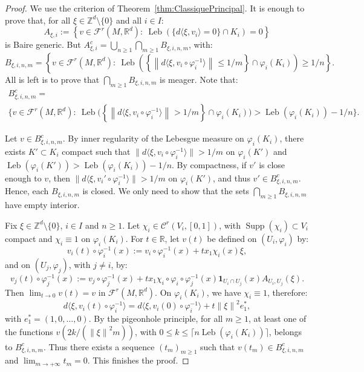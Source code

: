 \documentclass[10pt]{amsart}
\theoremstyle{definition}\newtheorem{defi}[theo]{Definition}\newtheorem{rema}[theo]{Remark}\newtheorem{exam}[theo]{Example}\newtheorem{exem}[theo]{Example}\newtheorem{nota}[theo]{Notation}
\DeclareMathOperator{\Leb}{Leb}
\DeclareMathOperator{\Supp}{Supp}
\newcommand{\Z}{\mathbb{Z}}
\newcommand{\R}{\mathbb{R}}
\newcommand{\Ccal}{\mathcal{C}}
\newcommand{\Fcal}{\mathcal{F}}
\newcommand{\norm}[2]{\left\| #1 \right\|_{#2}}
\begin{document}
\begin{proof}
We use the criterion of Theorem~\ref{thm:ClassiquePrincipal}. It is enough to prove that, for all $\xi \in \Z^d \setminus \{0\}$ and all $i \in I$:
\[
A_{\xi, i} := \left\{v \in \Fcal^r (M, \R^d): \ \Leb (\{d \langle \xi, v_i \rangle =0\} \cap K_i) = 0\right\}
\]
is Baire generic. But $A_{\xi, i}^c = \bigcup_{n \geq 1} \bigcap_{m \geq 1} B_{\xi, i, n, m}$, with:
\[
B_{\xi, i, n, m} = \left\{v \in \Fcal^r (M, \R^d): \ \Leb \left(\left\{\norm{d\langle \xi, v_i \circ \varphi_i^{-1} \rangle}{} \leq 1/m\right\} \cap \varphi_i(K_i)\right) \geq 1/n\right\}.
\]
All is left is to prove that $\bigcap_{m \geq 1} B_{\xi, i, n, m}$ is meager. Note that:
\begin{multline*}
B_{\xi, i, n, m}^c  =\\
\Big\{v \in \Fcal^r (M, \R^d):\!\ \Leb \Big(\left\{ \norm{d\langle \xi, v_i \circ \varphi_i^{-1} \rangle}{} > 1/m \right\} \cap \varphi_i(K_i) \Big) 
> \Leb (\varphi_i(K_i))-1/n \Big\}.
\end{multline*}



Let $v \in B_{\xi, i, n, m}^c$. By inner regularity of the Lebesgue measure on $\varphi_i (K_i)$, there exists $K' \subset K_i$ compact such that $\|{d\langle \xi, v_i \circ \varphi_i^{-1} \rangle}\|{} > 1/m$ on $\varphi_i(K')$ and $\Leb(\varphi_i(K'))> \Leb (\varphi_i(K_i))-1/n$. By compactness, if $v'$ is close enough to $v$, then $\|{d\langle \xi, v_i' \circ \varphi_i^{-1} \rangle}\|{} > 1/m$ on $\varphi_i(K')$, and thus $v' \in B_{\xi, i, n, m}^c$. Hence, each $B_{\xi, i, n, m}$ is closed. We only need to show that the sets $\bigcap_{m \geq 1} B_{\xi, i, n, m}$ have empty interior.


Fix $\xi \in \Z^d \setminus \{0\}$, $i \in I$ and $n \geq 1$. Let $\chi_i \in \Ccal^r (V_i,[0,1])$, with $\Supp (\chi_i) \subset V_i$ compact and $\chi_i \equiv 1$ on $\varphi_i(K_i)$. For $t \in \R$, let $v (t)$ be defined on $(U_i, \varphi_i)$ by:
\[
v_i (t) \circ \varphi_i^{-1} (x) := v_i \circ \varphi_i^{-1} (x)+ t x_1 \chi_i (x) \xi,
\]
and on $(U_j, \varphi_j)$, with $j \neq i$, by:
\[
v_j (t) \circ \varphi_j^{-1} (x) := v_j \circ \varphi_j^{-1} (x) + t x_1 \chi_i \circ \varphi_i \circ \varphi_j^{-1} (x) \mathbf{1}_{U_i \cap U_j} (x) A_{U_i, U_j} (\xi).
\]
Then $\lim_{t \to 0} v(t) = v$ in $\Fcal^r (M, \R^d)$. On $\varphi_i(K_i)$, we have $\chi_i \equiv 1$, therefore:
\[
d\langle \xi, v_i (t) \circ \varphi_i^{-1} \rangle = d\langle \xi, v_i (0) \circ \varphi_i^{-1} \rangle + t \norm{\xi}{}^2 e_1^*,
\]
with $e_1^* = (1,0, \ldots, 0)$. By the pigeonhole principle, for all $m \geq 1$, at least one of the functions $v(2k/(\norm{\xi}{}^2 m))$, with $0 \leq k \leq \lceil n \Leb (\varphi_i(K_i)) \rceil$, belongs to $B_{\xi, i, n, m}^c$. Thus there exists a sequence $(t_m)_{m \geq 1}$ such that $v(t_m) \in B_{\xi, i, n, m}^c$ and $\lim_{m \to + \infty} t_m = 0$. This finishes the proof.
\end{proof}
\end{document}
